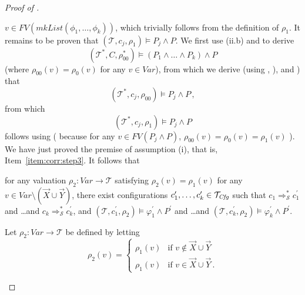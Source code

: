 \begin{proof}[Proof of ]
\begin{enumerate}
    $v \in \mathit{FV}(\mathit{mkList}(\phi_1,\ldots,\phi_k))$, which trivially follows from the definition of $\rho_1$.
    It remains to be proven that $(\mathcal{T}, c_j, \rho_1) \vDash P_j \land P$.
    We first use (ii.b) and  to derive
    \begin{equation*}
        (\mathcal{T}^*, C, \rho_{00}^*) \vDash (P_1 \land \ldots \land P_k) \land P
    \end{equation*}
    (where $\rho_{00}(v) = \rho_0(v)$ for any $v \in \mathit{Var}$),
    from which we derive (using , ),
    and ) that
    \begin{equation*}
        (\mathcal{T}^*, c_j, \rho_{00}) \vDash P_j \land P \, ,
    \end{equation*}
    from which
    \begin{equation*}
        (\mathcal{T}^*, c_j, \rho_1) \vDash P_j \land P
    \end{equation*}
    follows using 
    (
    because for any $v \in \mathit{FV}(P_j \land P)$, 
    $\rho_{00}(v) = \rho_0(v) = \rho_1(v)$
    ).
    \\
    We have just proved the premise of assumption (i),
    that is, Item~\ref{item:corr:step3}.
    It follows that
    \begin{proofenv}
        for any valuation $\rho_2 : \mathit{Var} \to \mathcal{T}$
        satisfying $\rho_2(v) = \rho_1(v)$ for any $v \in \mathit{Var} \setminus (\vec{X} \cup \vec{Y})$,
        there exist configurations $c_1^\prime,\ldots,c_k^\prime \in \mathcal{T}_{\mathit{Cfg}}$ such that
        $c_1 \Rightarrow^*_{\mathcal{S}} c_1^\prime$ and \ldots and
        $c_k \Rightarrow^*_{\mathcal{S}} c_k^\prime$,
        and $(\mathcal{T}, c_1^\prime,\rho_2) \vDash \varphi_1^\prime \land P^\prime$ and \ldots and $(\mathcal{T}, c_k^\prime, \rho_2) \vDash \varphi_k^\prime \land P^\prime$.
    \end{proofenv}
    Let $\rho_2 : \mathit{Var} \to \mathcal{T}$ be defined by letting 
    \begin{equation*}
        \rho_2(v) = 
        \begin{cases}
            \rho_1(v) & \text{if } v \not\in \vec{X} \cup \vec{Y} \\
            \rho_1(v) & \text{if } v \in \vec{X} \cup \vec{Y} \, .
        \end{cases}
    \end{equation*}

\end{enumerate}
\end{proof}
